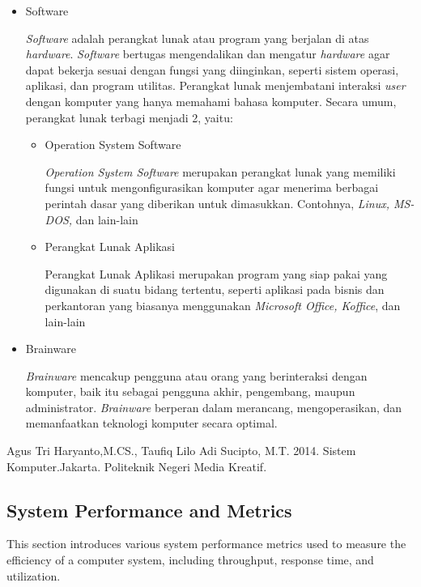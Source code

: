 \documentclass[12pt]{article}
\begin{document}
\begin{itemize}
        \item Software 
        \par
        \textit{Software} adalah perangkat lunak atau program yang berjalan di atas \textit{hardware}. \textit{Software} bertugas mengendalikan dan mengatur \textit{hardware} agar dapat bekerja sesuai dengan fungsi yang diinginkan, seperti sistem operasi, aplikasi, dan program utilitas. Perangkat lunak menjembatani interaksi\textit{ user} dengan komputer yang hanya memahami bahasa komputer. Secara umum, perangkat lunak terbagi menjadi 2, yaitu:
        \begin{itemize}
            \item Operation System Software
            \par
            \textit{Operation System Software} merupakan perangkat lunak yang memiliki fungsi untuk mengonfigurasikan komputer agar menerima berbagai perintah dasar yang diberikan untuk dimasukkan. Contohnya, \textit{Linux, MS-DOS,} dan lain-lain
            \item Perangkat Lunak Aplikasi
            \par
            Perangkat Lunak Aplikasi merupakan program yang siap pakai yang digunakan di suatu bidang tertentu, seperti aplikasi pada bisnis dan perkantoran yang biasanya menggunakan\textit{ Microsoft Office, Koffice}, dan lain-lain
        \end{itemize}
        \item Brainware 
        \par
       \textit{ Brainware } mencakup pengguna atau orang yang berinteraksi dengan komputer, baik itu sebagai pengguna akhir, pengembang, maupun administrator. \textit{Brainware }berperan dalam merancang, mengoperasikan, dan memanfaatkan teknologi komputer secara optimal.
    \end{itemize}
    \begin{bibliography}
    Agus Tri Haryanto,M.CS., Taufiq Lilo Adi Sucipto, M.T. 2014. Sistem Komputer.Jakarta. Politeknik Negeri Media Kreatif.
\end{bibliography}

   

\subsection{System Performance and Metrics}
This section introduces various system performance metrics used to measure the efficiency of a computer system, including throughput, response time, and utilization.
\end{document}
